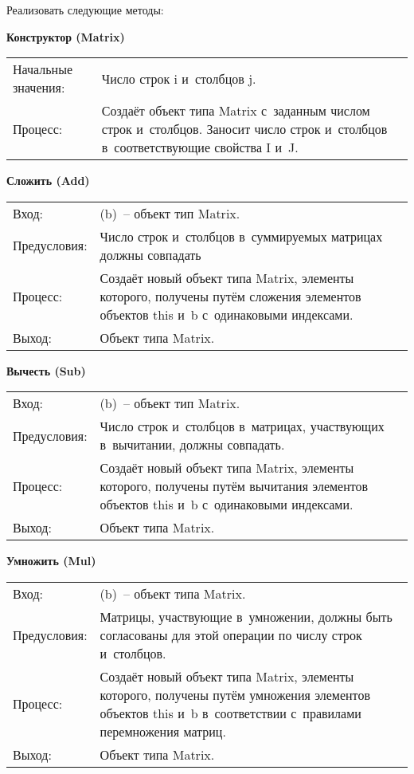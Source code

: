 \documentclass[a4paper,14pt]{extreport}
\begin{document}
Реализовать следующие методы:

\noindent
\begin{minipage}{\textwidth}
	\vspace{1em}
	{\bf Конструктор (Matrix)}
	\flushright
	\begin{tabularx}{.95\textwidth}{lX}
		Начальные значения: & Число строк i и столбцов j.\\
		Процесс: & Создаёт объект типа Matrix с заданным числом строк и столбцов.
		Заносит число строк и столбцов в соответствующие свойства I и J.\\
	\end{tabularx}
\end{minipage}

\noindent
\begin{minipage}{\textwidth}
	\vspace{1em}
	{\bf Сложить (Add)}
	\flushright
	\begin{tabularx}{.95\textwidth}{lX}
		Вход: & (b) – объект тип Matrix.\\
		Предусловия: & Число строк и столбцов в суммируемых матрицах должны совпадать\\
		Процесс: & Создаёт новый объект типа Matrix, элементы которого, получены путём сложения элементов объектов this и b с одинаковыми индексами.\\
		Выход: & Объект типа Matrix.\\
	\end{tabularx}
\end{minipage}

\noindent
\begin{minipage}{\textwidth}
	\vspace{1em}
	{\bf Вычесть (Sub)}
	\flushright
	\begin{tabularx}{.95\textwidth}{lX}
		Вход: & (b) – объект тип Matrix.\\
		Предусловия: & Число строк и столбцов в матрицах, участвующих в вычитании, должны совпадать.\\
		Процесс: & Создаёт новый объект типа Matrix, элементы которого, получены путём вычитания элементов объектов this и b с одинаковыми индексами.\\
		Выход: & Объект типа Matrix.
	\end{tabularx}
\end{minipage}

\noindent
\begin{minipage}{\textwidth}
	\vspace{1em}
	{\bf Умножить (Mul)}
	\flushright
	\begin{tabularx}{.95\textwidth}{lX}
		Вход: & (b) – объект типа Matrix.\\
		Предусловия: & Матрицы, участвующие в умножении, должны быть согласованы для этой операции по числу строк и столбцов.\\
		Процесс: & Создаёт новый объект типа Matrix, элементы которого, получены путём умножения элементов объектов this и b в соответствии с правилами перемножения матриц.\\
		Выход: & Объект типа Matrix.
	\end{tabularx}
\end{minipage}
\end{document}
